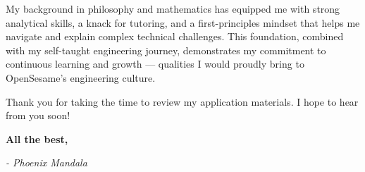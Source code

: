 \documentclass[10pt, letterpaper]{article}
\begin{document}
\begin{doublespace}
\begin{adjustwidth}
			My background in philosophy and mathematics has equipped me with strong
			analytical skills, a knack for tutoring, and a first-principles mindset
			that helps me navigate and explain complex technical challenges. This foundation,
			combined with my self-taught engineering journey, demonstrates my commitment
			to continuous learning and growth — qualities I would proudly bring to OpenSesame's
			engineering culture.

			Thank you for taking the time to review my application materials. I hope
			to hear from you soon!
		\end{adjustwidth}

		\noindent
		\textbf{All the best,}

		\noindent
		\textit{- Phoenix Mandala}
	\end{doublespace}
\end{document}
